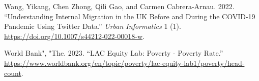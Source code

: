 \documentclass[11pt,letterpaper]{article}
\newlength{\cslhangindent}
\newlength{\cslentryspacingunit} %
\newenvironment{CSLReferences}[2] %
 {%
  \setlength{\parindent}{0pt}
  \ifodd #1
  \let\oldpar\par
  \def\par{\hangindent=\cslhangindent\oldpar}
  \fi
  \setlength{\parskip}{#2\cslentryspacingunit}
 }%
 {}
\begin{document}
\begin{CSLReferences}{1}{0}
Wang, Yikang, Chen Zhong, Qili Gao, and Carmen Cabrera-Arnau. 2022.
{``Understanding Internal Migration in the UK Before and During the
COVID-19 Pandemic Using Twitter Data.''} \emph{Urban Informatics} 1 (1).
\url{https://doi.org/10.1007/s44212-022-00018-w}.

World Bank", "The. 2023. {``LAC Equity Lab: Poverty - Poverty Rate.''}
\url{https://www.worldbank.org/en/topic/poverty/lac-equity-lab1/poverty/head-count}.

\end{CSLReferences}




\setlength{\bibsep}{0.00cm plus 0.05cm} %


\end{document}
